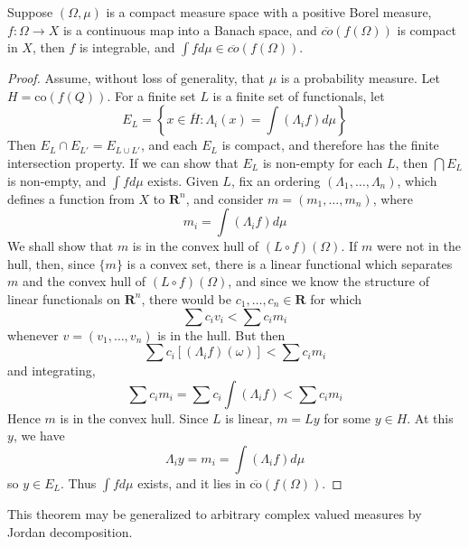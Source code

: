 \begin{theorem}
    Suppose $(\Omega, \mu)$ is a compact measure space with a positive Borel measure, $f: \Omega \to X$ is a continuous map into a Banach space, and $\overline{co}(f(\Omega))$ is compact in $X$, then $f$ is integrable, and $\int f d\mu \in \overline{co}(f(\Omega))$.
\end{theorem}
\begin{proof}
    Assume, without loss of generality, that $\mu$ is a probability measure. Let $H = \text{co}(f(Q))$. For a finite set $L$ is a finite set of functionals, let
    \[ E_L = \left\{ x \in \overline{H} : \Lambda_i(x) = \int (\Lambda_i f) d\mu \right\} \]
    Then $E_L \cap E_{L'} = E_{L \cup L'}$, and each $E_L$ is compact, and therefore has the finite intersection property. If we can show that $E_L$ is non-empty for each $L$, then $\bigcap E_L$ is non-empty, and $\int f d\mu$ exists. Given $L$, fix an ordering $(\Lambda_1, \dots, \Lambda_n)$, which defines a function from $X$ to $\mathbf{R}^n$, and consider $m = (m_1, \dots, m_n)$, where
    \[ m_i = \int (\Lambda_i f) d\mu \]
    We shall show that $m$ is in the convex hull of $(L \circ f)(\Omega)$. If $m$ were not in the hull, then, since $\{ m \}$ is a convex set, there is a linear functional which separates $m$ and the convex hull of $(L \circ f)(\Omega)$, and since we know the structure of linear functionals on $\mathbf{R}^n$, there would be $c_1, \dots, c_n \in \mathbf{R}$ for which
    \[ \sum c_i v_i < \sum c_i m_i \]
    whenever $v = (v_1, \dots, v_n)$ is in the hull. But then
    \[ \sum c_i [(\Lambda_if) (\omega)] < \sum c_i m_i \]
    and integrating,
    \[ \sum c_i m_i = \sum c_i \int (\Lambda_i f) < \sum c_i m_i \]
    Hence $m$ is in the convex hull. Since $L$ is linear, $m = Ly$ for some $y \in H$. At this $y$, we have
    \[ \Lambda_i y = m_i = \int (\Lambda_i f) d\mu \]
    so $y \in E_L$. Thus $\int f d\mu$ exists, and it lies in $\overline{\text{co}}(f(\Omega))$.
\end{proof}

This theorem may be generalized to arbitrary complex valued measures by Jordan decomposition.

